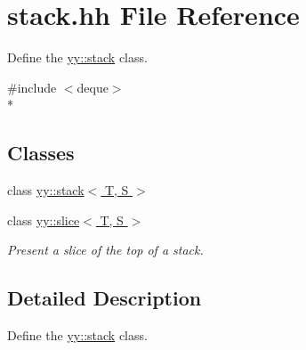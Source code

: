 \hypertarget{stack_8hh}{\section{stack.\-hh File Reference}
\label{stack_8hh}
}


Define the \hyperlink{classyy_1_1stack}{yy\-::stack} class.  


{\ttfamily \#include $<$deque$>$}\\*
\subsection*{Classes}
\begin{DoxyCompactItemize}
\item 
class \hyperlink{classyy_1_1stack}{yy\-::stack$<$ T, S $>$}
\item 
class \hyperlink{classyy_1_1slice}{yy\-::slice$<$ T, S $>$}
\begin{DoxyCompactList}\small\item\em Present a slice of the top of a stack. \end{DoxyCompactList}\end{DoxyCompactItemize}


\subsection{Detailed Description}
Define the \hyperlink{classyy_1_1stack}{yy\-::stack} class. 